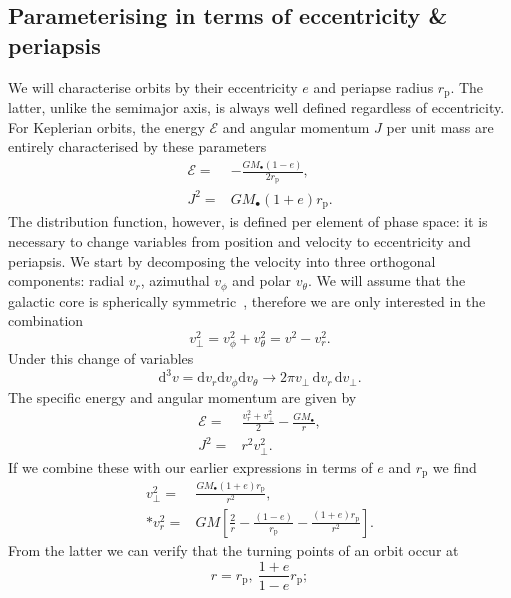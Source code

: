 \documentclass[useAMS,usedcolumn,usegraphicx,usenatbib]{mn2e}
\newcommand{\sub}[1]{\ensuremath{_\mathrm{#1}}}
\newcommand{\dd}{\ensuremath{\mathrm{d}}}
\begin{document}
\subsection{Parameterising in terms of eccentricity \& periapsis}

We will characterise orbits by their eccentricity $e$ and periapse radius $r\sub{p}$. The latter, unlike the semimajor axis, is always well defined regardless of eccentricity. For Keplerian orbits, the energy $\mathcal{E}$ and angular momentum $J$ per unit mass are entirely characterised by these parameters
\begin{align}
\label{eq:Energy_ecc}
\mathcal{E} = {} & -\frac{GM_\bullet(1 - e)}{2r\sub{p}},\\
J^2 = {} & GM_\bullet(1 + e)r\sub{p}.
\end{align}
The distribution function, however, is defined per element of phase space: it is necessary to change variables from position and velocity to eccentricity and periapsis. We start by decomposing the velocity into three orthogonal components: radial $v_r$, azimuthal $v_\phi$ and polar $v_\theta$. We will assume that the galactic core is spherically symmetric~\citep{Genzel2003, Schodel2007}, therefore we are only interested in the combination
\begin{equation}
v_\perp^2 = v_\phi^2 + v_\theta^2 = v^2 - v_r^2.
\end{equation}
Under this change of variables
\begin{equation}
\dd^3v = \dd v_r \dd v_\phi \dd v_\theta \rightarrow 2\pi v_\perp \,\dd v_r \,\dd v_\perp.
\end{equation}
The specific energy and angular momentum are given by
\begin{align}
\mathcal{E} = {} & \frac{v_r^2 + v_\perp^2}{2} - \frac{GM_\bullet}{r},\\
J^2 = {} & r^2 v_\perp^2.
\end{align}
If we combine these with our earlier expressions in terms of $e$ and $r\sub{p}$ we find
\begin{align}
v_\perp^2 = {} & \frac{GM_\bullet(1 + e)r\sub{p}}{r^2}, \nonumber \\*
v_r^2 = {} & GM\left[\frac{2}{r} - \frac{(1 - e)}{r\sub{p}} - \frac{(1 + e)r\sub{p}}{r^2}\right].
\end{align}
From the latter we can verify that the turning points of an orbit occur at
\begin{equation}
r = r\sub{p}, \: \frac{1+e}{1-e}r\sub{p};
\end{equation}
\end{document}
